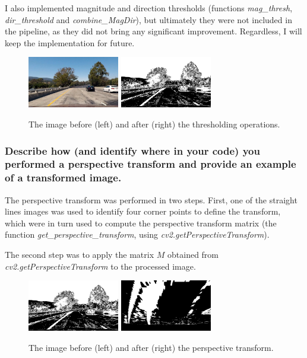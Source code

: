 \documentclass[a4paper,10pt]{article}
\begin{document}
I also implemented magnitude and direction thresholds (functions \emph{mag\_thresh}, \emph{dir\_threshold} and \emph{combine\_MagDir}),
but ultimately they were not included in the pipeline, as they did not bring any significant improvement.
Regardless, I will keep the implementation for future.

\begin{figure}[h]
  \begin{center}
    \includegraphics[width=40mm]{../output_images/undistorted.jpg}
    \quad
    \includegraphics[width=40mm]{../output_images/thresholded.jpg}
  \caption{The image before (left) and after (right) the thresholding operations.}
\end{center}
\end{figure}


\subsubsection{Describe how (and identify where in your code) you performed a perspective transform and provide an example of a transformed image.}

The perspective transform was performed in two steps.
First, one of the straight lines images was used to identify four corner points to define the transform,
which were in turn used to compute the perspective transform matrix
(the function \emph{get\_perspective\_transform}, using \emph{cv2.getPerspectiveTransform}).

The second step was to apply the matrix $M$ obtained from \emph{cv2.getPerspectiveTransform} to the processed image.

\begin{figure}[h]
  \begin{center}
    \includegraphics[width=40mm]{../output_images/thresholded.jpg}
    \quad
    \includegraphics[width=40mm]{../output_images/warped.jpg}
  \caption{The image before (left) and after (right) the perspective transform.}
\end{center}
\end{figure}
\end{document}
